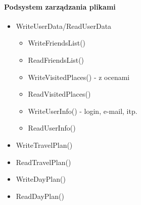 \documentclass[10pt,twoside,a4paper]{report}
\begin{document}
\paragraph{Podsystem zarządzania plikami}
\begin{itemize}
\item WriteUserData/ReadUserData
\begin{itemize}
\item WriteFriendsList()
\item ReadFriendsList()
\item WriteVisitedPlaces() - z ocenami
\item ReadVisitedPlaces()
\item WriteUserInfo() - login, e-mail, itp.
\item ReadUserInfo()
\end{itemize}
\item WriteTravelPlan()
\item ReadTravelPlan()
\item WriteDayPlan()
\item ReadDayPlan()
\end{itemize}
\end{document}
